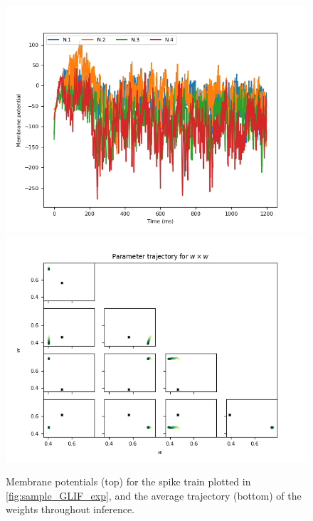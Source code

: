 \documentclass[mphil,deptreport,ianc]{infthesis} %
\begin{document}
\begin{figure}
    \centering
    \vspace{-0.1in}
    \includegraphics[width=0.8\columnwidth]{figures/samples/GLIF/12-09_16-14-54-627/membrane_pots_train_i_100.png}
    \includegraphics[width=0.8\columnwidth]{figures/samples/GLIF/12-09_16-14-54-627/test_weights_inference_trajectories_param_w.png}
    \vspace{-0.1in}
    \caption{Membrane potentials (top) for the spike train plotted in \ref{fig:sample_GLIF_exp}, and the average trajectory (bottom) of the weights throughout inference.}
    \label{fig:sample_GLIF_exp_vs_traject}
\end{figure}
\end{document}
